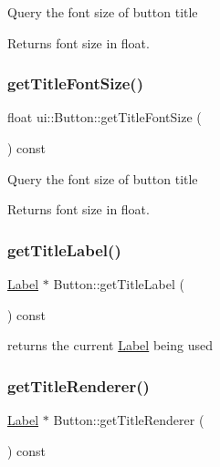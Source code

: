 Query the font size of button title \begin{DoxyReturn}{Returns}
font size in float. 
\end{DoxyReturn}
\mbox{\label{classui_1_1Button_afbc05742447e6364123f10b97ad1cc4c}} 
\subsubsection{\texorpdfstring{get\+Title\+Font\+Size()}{getTitleFontSize()}\hspace{0.1cm}{\footnotesize\ttfamily [2/2]}}
{\footnotesize\ttfamily float ui\+::\+Button\+::get\+Title\+Font\+Size (\begin{DoxyParamCaption}{ }\end{DoxyParamCaption}) const}

Query the font size of button title \begin{DoxyReturn}{Returns}
font size in float. 
\end{DoxyReturn}
\mbox{\label{classui_1_1Button_acf61a4761360fa161cb55d73ded122a0}} 
\subsubsection{\texorpdfstring{get\+Title\+Label()}{getTitleLabel()}}
{\footnotesize\ttfamily \hyperlink{classLabel}{Label} $\ast$ Button\+::get\+Title\+Label (\begin{DoxyParamCaption}{ }\end{DoxyParamCaption}) const}

returns the current \hyperlink{classLabel}{Label} being used \mbox{\label{classui_1_1Button_ab6cf9c1431bdb13d29f50a63d6cf7067}} 
\subsubsection{\texorpdfstring{get\+Title\+Renderer()}{getTitleRenderer()}\hspace{0.1cm}{\footnotesize\ttfamily [1/2]}}
{\footnotesize\ttfamily \hyperlink{classLabel}{Label} $\ast$ Button\+::get\+Title\+Renderer (\begin{DoxyParamCaption}{ }\end{DoxyParamCaption}) const}

